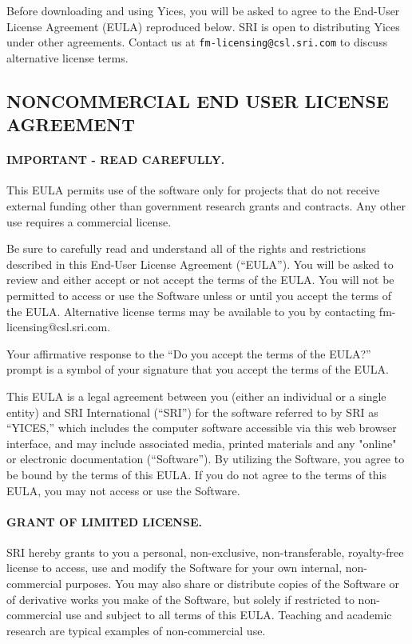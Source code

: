 \documentclass[11pt,twoside,fleqn,openright,titlepage]{cslreport}
\begin{document}
Before downloading and using Yices, you will be asked to agree to the
End-User License Agreement (EULA) reproduced below. SRI is open to
distributing Yices under other agreements. Contact us at
\texttt{fm-licensing@csl.sri.com} to discuss alternative license
terms.

\begin{small}
\subsection*{NONCOMMERCIAL END USER LICENSE AGREEMENT}


\paragraph{IMPORTANT - READ CAREFULLY.}
This EULA  permits use of the  software only for projects  that do not
receive  external funding  other than  government research  grants and
contracts.  Any other use requires a commercial license.

Be  sure  to carefully  read  and understand  all  of  the rights  and
restrictions  described in this  End-User License  Agreement (``EULA'').
You will be asked to review  and either accept or not accept the terms
of the EULA.  You will not be permitted to access  or use the Software
unless or until you accept  the terms of the EULA. Alternative license
terms may be available to you by contacting fm-licensing@csl.sri.com.

Your  affirmative response  to the  ``Do you  accept the  terms  of the
EULA?'' prompt is a symbol of  your signature that you accept the terms
of the EULA.

This EULA is a legal agreement  between you (either an individual or a
single entity) and SRI International (``SRI'') for the software referred
to by SRI as ``YICES,'' which includes the computer software accessible
via  this web  browser interface,  and may  include  associated media,
printed  materials  and   any  "online"  or  electronic  documentation
(``Software''). By utilizing the Software,  you agree to be bound by the
terms of this EULA. If you do not agree to the terms of this EULA, you
may not access or use the Software.


\paragraph{GRANT OF LIMITED LICENSE.}
SRI hereby grants to  you a personal, non-exclusive, non-transferable,
royalty-free license to  access, use and modify the  Software for your
own  internal,  non-commercial  purposes.    You  may  also  share  or
distribute copies of  the Software or of derivative  works you make of
the  Software, but  solely  if restricted  to  non-commercial use  and
subject to all terms of this EULA.  Teaching and academic research are
typical examples of non-commercial use.


\end{small}
\end{document}
